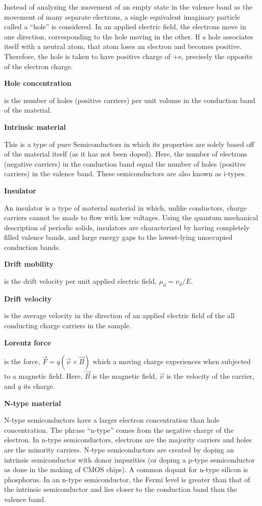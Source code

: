 \documentclass{../lab}
\begin{document}
Instead of analyzing the movement of an empty state in the valence band as the movement of many separate electrons, a single equivalent imaginary particle called a ``hole'' is considered. In an applied electric field, the electrons move in one direction, corresponding to the hole moving in the other. If a hole associates itself with a neutral atom, that atom loses an electron and becomes positive. Therefore, the hole is taken to have positive charge of +e, precisely the opposite of the electron charge.

\textbf{Hole concentration}

is the number of holes (positive carriers) per unit volume in the conduction band of the material.

\textbf{Intrinsic material}

This is a type of pure Semiconductors in which its properties are solely based off of the material itself (as it has not been doped). Here, the number of electrons (negative carriers) in the conduction band equal the number of holes (positive carriers) in the valence band. These semiconductors are also known as i-types.

\textbf{Insulator}

An insulator is a type of material material in which, unlike conductors, charge carriers cannot be made to flow with low voltages. Using the quantum mechanical description of periodic solids, insulators are characterized by having completely filled valence bands, and large energy gaps to the lowest-lying unoccupied conduction bands.

\textbf{Drift mobility}

is the drift velocity per unit applied electric field, $\mu_d = \nu_d/ E$.

\textbf{Drift velocity}

is the average velocity in the direction of an applied electric field of the all conducting charge carriers in the sample.

\textbf{Lorentz force}

is the force, $\vec{F} = q(\vec{\nu} \times \vec{B}) $ which a moving charge experiences when subjected to a magnetic field. Here, $\vec{B}$ is the magnetic field, $\vec{\nu}$ is the velocity of the carrier, and $q$ its charge.

\textbf{N-type material}

N-type semiconductors have a larger electron concentration than hole concentration. The phrase ``n-type'' comes from the negative charge of the electron. In n-type semiconductors, electrons are the majority carriers and holes are the minority carriers. N-type semiconductors are created by doping an intrinsic semiconductor with donor impurities (or doping a p-type semiconductor as done in the making of CMOS chips). A common dopant for n-type silicon is phosphorus. In an n-type semiconductor, the Fermi level is greater than that of the intrinsic semiconductor and lies closer to the conduction band than the valence band.
\end{document}
